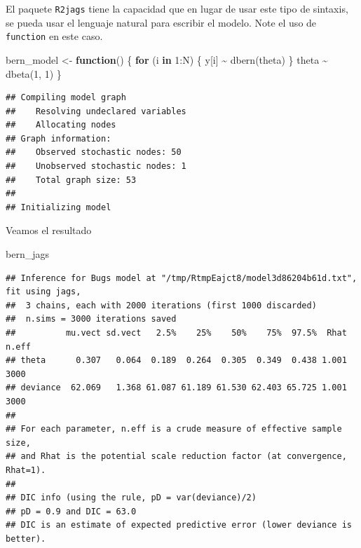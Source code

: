 \documentclass[
  12pt,
]{book}
\newenvironment{Shaded}{\begin{snugshade}}{\end{snugshade}}
\newcommand{\AttributeTok}[1]{\textcolor[rgb]{0.77,0.63,0.00}{#1}}
\newcommand{\ControlFlowTok}[1]{\textcolor[rgb]{0.13,0.29,0.53}{\textbf{#1}}}
\newcommand{\DecValTok}[1]{\textcolor[rgb]{0.00,0.00,0.81}{#1}}
\newcommand{\FunctionTok}[1]{\textcolor[rgb]{0.00,0.00,0.00}{#1}}
\newcommand{\NormalTok}[1]{#1}
\newcommand{\OtherTok}[1]{\textcolor[rgb]{0.56,0.35,0.01}{#1}}
\newcommand{\SpecialCharTok}[1]{\textcolor[rgb]{0.00,0.00,0.00}{#1}}
\newcommand{\StringTok}[1]{\textcolor[rgb]{0.31,0.60,0.02}{#1}}
\theoremstyle{definition}
\theoremstyle{definition}
\theoremstyle{definition}
\theoremstyle{remark}
\begin{document}
El paquete \texttt{R2jags} tiene la capacidad que en lugar de usar este tipo de sintaxis, se pueda usar el lenguaje natural para escribir el modelo. Note el uso de \texttt{function} en este caso.

\begin{Shaded}
\begin{Highlighting}[]
\NormalTok{bern\_model }\OtherTok{\textless{}{-}} \ControlFlowTok{function}\NormalTok{() \{}
    \ControlFlowTok{for}\NormalTok{ (i }\ControlFlowTok{in} \DecValTok{1}\SpecialCharTok{:}\NormalTok{N) \{}
\NormalTok{        y[i] }\SpecialCharTok{\textasciitilde{}} \FunctionTok{dbern}\NormalTok{(theta)}
\NormalTok{    \}}
\NormalTok{    theta }\SpecialCharTok{\textasciitilde{}} \FunctionTok{dbeta}\NormalTok{(}\DecValTok{1}\NormalTok{, }\DecValTok{1}\NormalTok{)}
\NormalTok{\}}
\end{Highlighting}
\end{Shaded}

\begin{Shaded}
\end{Shaded}

\begin{verbatim}
## Compiling model graph
##    Resolving undeclared variables
##    Allocating nodes
## Graph information:
##    Observed stochastic nodes: 50
##    Unobserved stochastic nodes: 1
##    Total graph size: 53
## 
## Initializing model
\end{verbatim}

Veamos el resultado

\begin{Shaded}
\begin{Highlighting}[]
\NormalTok{bern\_jags}
\end{Highlighting}
\end{Shaded}

\begin{verbatim}
## Inference for Bugs model at "/tmp/RtmpEajct8/model3d86204b61d.txt", fit using jags,
##  3 chains, each with 2000 iterations (first 1000 discarded)
##  n.sims = 3000 iterations saved
##          mu.vect sd.vect   2.5%    25%    50%    75%  97.5%  Rhat n.eff
## theta      0.307   0.064  0.189  0.264  0.305  0.349  0.438 1.001  3000
## deviance  62.069   1.368 61.087 61.189 61.530 62.403 65.725 1.001  3000
## 
## For each parameter, n.eff is a crude measure of effective sample size,
## and Rhat is the potential scale reduction factor (at convergence, Rhat=1).
## 
## DIC info (using the rule, pD = var(deviance)/2)
## pD = 0.9 and DIC = 63.0
## DIC is an estimate of expected predictive error (lower deviance is better).
\end{verbatim}
\end{document}
